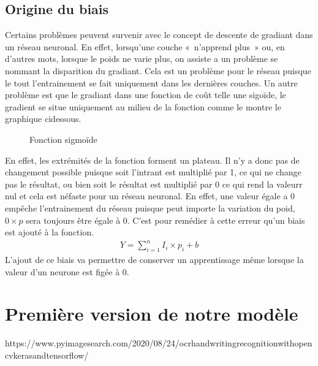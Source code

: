 \documentclass[letterpaper,10pt,french]{sphinxmanual}
\begin{document}
\subsection{Origine du biais}
\label{\detokenize{OCR_SAM:origine-du-biais}}
Certains problèmes peuvent survenir avec le concept de descente de gradiant dans un réseau neuronal. En effet, lorsqu’une couche « n’apprend plus » ou, en d’autres mots, lorsque le poids ne varie plus, on assiste a un problème se nommant la disparition du gradiant. Cela est un problème pour le réseau puisque le tout l’entrainement se fait uniquement dans les dernières couches. Un autre problème est que le gradiant dans une fonction de coût telle une sigoïde, le gradient se situe uniquement au milieu de la fonction comme le montre le graphique ci\sphinxhyphen{}dessous.

\begin{figure}[htbp]
\centering
\capstart

\noindent{}
\caption{Fonction sigmoïde}\label{\detokenize{OCR_SAM:tanh}}\end{figure}

En effet, les extrémités de la fonction forment un plateau. Il n’y a donc pas de changement possible puisque soit l’intrant est multiplié par 1, ce qui ne change pas le résultat, ou bien soit le résultat est multiplié par 0 ce qui rend la valeurr nul et cela est néfaste pour un réseau neuronal. En effet, une valeur égale a 0 empêche l’entrainement du réseau puisque peut importe la variation du poid, \(0\times p\) sera toujours être égale à 0. C’est pour remédier à cette erreur qu’un biais est ajouté à la fonction.
\begin{equation*}
\begin{split}Y =\sum_{i=1}^{n} I_i \times p_i + b\end{split}
\end{equation*}
L’ajout de ce biais va permettre de conserver un apprentissage même lorsque la valeur d’un neurone est figée à 0.


\section{Première version de notre modèle}
\label{\detokenize{OCR_SAM:premiere-version-de-notre-modele}}

https://www.pyimagesearch.com/2020/08/24/ocr\sphinxhyphen{}handwriting\sphinxhyphen{}recognition\sphinxhyphen{}with\sphinxhyphen{}opencv\sphinxhyphen{}keras\sphinxhyphen{}and\sphinxhyphen{}tensorflow/
\end{document}
